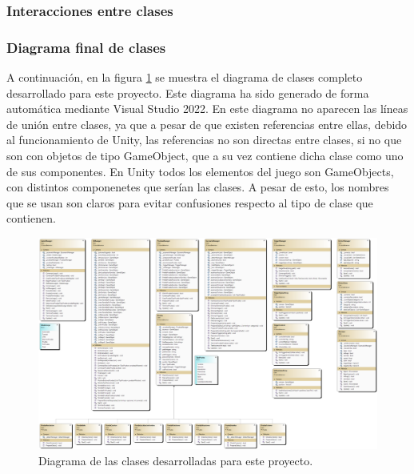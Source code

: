\subsubsection{Interacciones entre clases}

\subsubsection{Diagrama final de clases}

A continuación, en la figura \ref{fig:diagramaClases} se muestra el diagrama de clases completo desarrollado para este proyecto. Este diagrama ha sido generado de forma automática mediante Visual Studio 2022. En este diagrama no aparecen las líneas de unión entre clases, ya que a pesar de que existen referencias entre ellas, debido al funcionamiento de Unity, las referencias no son directas entre clases, si no que son con objetos de tipo GameObject, que a su vez contiene dicha clase como uno de sus componentes. En Unity todos los elementos del juego son GameObjects, con distintos componenetes que serían las clases. A pesar de esto, los nombres que se usan son claros para evitar confusiones respecto al tipo de clase que contienen.

\begin{figure}[H]
	\centering
	\includegraphics[width=1.5\textwidth, angle=-90]{04.Desarrollo/05.Entrega5/01.Iteracion5_1/00.Figuras/09.diagrama_clases.png}
	\caption{Diagrama de las clases desarrolladas para este proyecto.}
	\label{fig:diagramaClases}
\end{figure}






